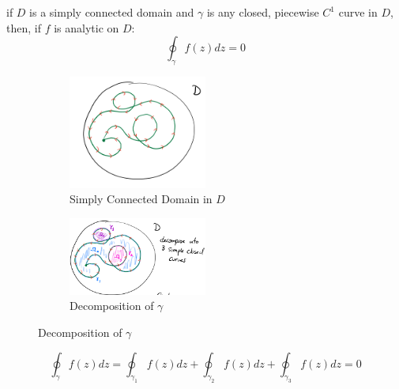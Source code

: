 \begin{theorem}
    if $D$ is a simply connected domain and $\gamma$ is any closed, piecewise $C^1$ curve in $D$, then, if $f$ is analytic on $D$:
    $$\oint_{\gamma} f(z) dz = 0$$
    \begin{figure}[H]
        \centering
        \begin{subfigure}{0.5\textwidth}
            \centering
            \includegraphics[width=0.5\textwidth]{LECTURE_7/1.png}
            \caption{Simply Connected Domain in $D$}
        \end{subfigure}
        \begin{subfigure}{0.5\textwidth}
            \centering
            \includegraphics[width=0.5\textwidth]{LECTURE_7/2.png}
            \caption{Decomposition of $\gamma$}
        \end{subfigure}
    \end{figure}
    $$ \oint_{\gamma} f(z) dz = \oint_{\gamma_1} f(z) dz + \oint_{\gamma_2} f(z) dz +  \oint_{\gamma_3} f(z) dz = 0$$
\end{theorem}

